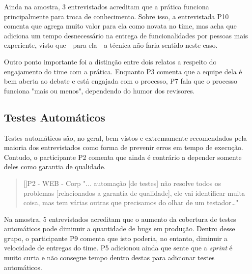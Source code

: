 Ainda na amostra, 3 entrevistados acreditam que a prática funciona principalmente para troca de conhecimento. Sobre isso, a entrevistada P10 comenta que agrega muito valor para ela como novata no time, mas acha que adiciona um tempo desnecessário na entrega de funcionalidades por pessoas mais experiente, visto que - para ela - a técnica não faria sentido neste caso.

Outro ponto importante foi a distinção entre dois relatos a respeito do engajamento do time com a prática. Enquanto P3 comenta que a equipe dela é bem aberta ao debate e está engajada com o processo, P7 fala que o processo funciona "mais ou menos", dependendo do humor dos revisores.

\subsection{Testes Automáticos}

Testes automáticos são, no geral, bem vistos e extremamente recomendados pela maioria dos entrevistados como forma de prevenir erros em tempo de execução. Contudo, o participante P2 comenta que ainda é contrário a depender somente deles como garantia de qualidade.

\begin{quotation}[]{P2 - WEB - Corp}
    "... automação [de testes] não resolve todos os problemas [relacionados a garantia de qualidade], ele vai identificar muita coisa, mas tem várias outras que precisamos do olhar de um testador…"
\end{quotation}

Na amostra, 5 entrevistados acreditam que o aumento da cobertura de testes automáticos pode diminuir a quantidade de bugs em produção. Dentro desse grupo, o participante P9 comenta que isto poderia, no entanto, diminuir a velocidade de entregas do time. P5 adicionou ainda que sente que a \emph{sprint} é muito curta e não consegue tempo dentro destas para adicionar testes automáticos.
